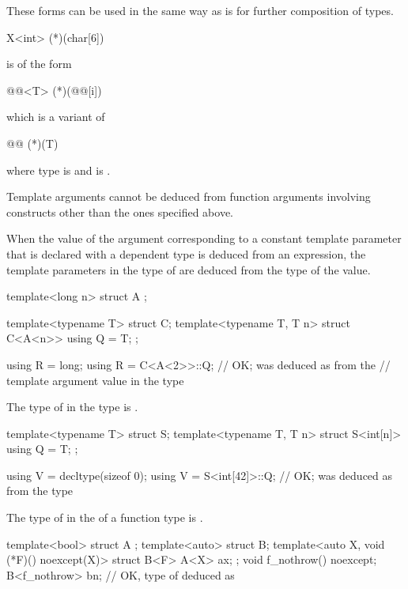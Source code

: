 \pnum
These forms can be used in the same way as
is for further composition of types.
\begin{example}
\begin{codeblock}
X<int> (*)(char[6])
\end{codeblock}
is of the form
\begin{codeblock}
@@<T> (*)(@@[i])
\end{codeblock}
which is a variant of
\begin{codeblock}
@@ (*)(T)
\end{codeblock}
where type is
and
is
.
\end{example}

\pnum
Template arguments cannot be deduced from function arguments involving
constructs other than the ones specified above.

\pnum
When the value of the argument
corresponding to a constant template parameter 
that is declared with a dependent type
is deduced from an expression,
the template parameters in the type of 
are deduced from the type of the value.
\begin{example}
\begin{codeblock}
template<long n> struct A { };

template<typename T> struct C;
template<typename T, T n> struct C<A<n>> {
  using Q = T;
};

using R = long;
using R = C<A<2>>::Q;           // OK;  was deduced as  from the
                                // template argument value in the type 
\end{codeblock}
\end{example}

\pnum
The type of  in the type  is .
\begin{example}
\begin{codeblock}
template<typename T> struct S;
template<typename T, T n> struct S<int[n]> {
  using Q = T;
};

using V = decltype(sizeof 0);
using V = S<int[42]>::Q;        // OK;  was deduced as  from the type 
\end{codeblock}
\end{example}

\pnum
The type of  in the 
 of a function type is .
\begin{example}
\begin{codeblock}
template<bool> struct A { };
template<auto> struct B;
template<auto X, void (*F)() noexcept(X)> struct B<F> {
  A<X> ax;
};
void f_nothrow() noexcept;
B<f_nothrow> bn;                // OK, type of  deduced as 
\end{codeblock}
\end{example}

